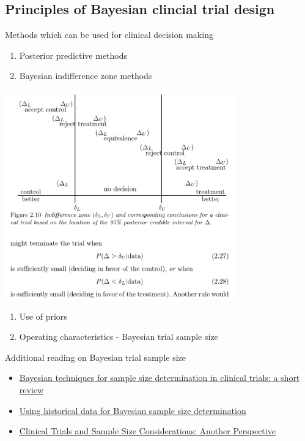 \documentclass[
]{article}
\providecommand{\tightlist}{%
  \setlength{\itemsep}{0pt}\setlength{\parskip}{0pt}}
\begin{document}
\hypertarget{principles-of-bayesian-clincial-trial-design}{%
\subsection{Principles of Bayesian clincial trial
design}\label{principles-of-bayesian-clincial-trial-design}}

Methods which can be used for clinical decision making

\begin{enumerate}
\def\labelenumi{\arabic{enumi}.}
\tightlist
\item
  Posterior predictive methods
\item
  Bayesian indifference zone methods
\end{enumerate}

\includegraphics[width=0.75\textwidth,height=\textheight]{Figure2.10.PNG}

\begin{enumerate}
\def\labelenumi{\arabic{enumi}.}
\setcounter{enumi}{2}
\tightlist
\item
  Use of priors
\item
  Operating characteristics - Bayesian trial sample size
\end{enumerate}

Additional reading on Bayesian trial sample size

\begin{itemize}
\tightlist
\item
  \href{https://doi.org/10.1191/0962280203sm345oa}{Bayesian techniques
  for sample size determination in clinical trials: a short review}
\item
  \href{https://doi.org/10.1111/j.1467-985X.2006.00438.}{Using
  historical data for Bayesian sample size determination}
\item
  \href{https://projecteuclid.org/journals/statistical-science/volume-15/issue-2/Clinical-Trials-and-Sample-Size-Considerations-AnotherPerspective/10.1214/ss/1009212752.full}{Clinical
  Trials and Sample Size Considerations: Another Perspective}
\end{itemize}
\end{document}
